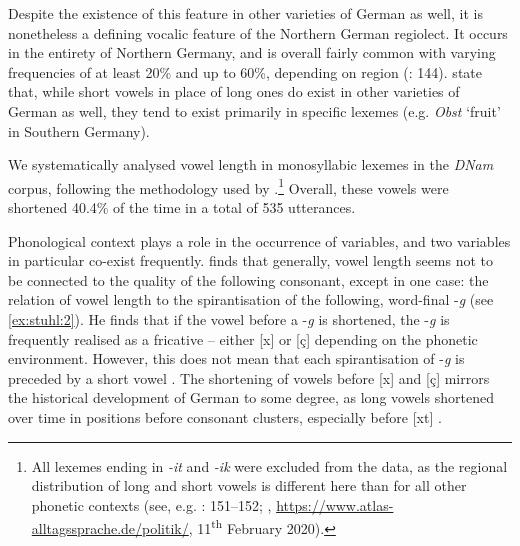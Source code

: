 \documentclass[output=paper]{langsci/langscibook}
\begin{document}
Despite the existence of this feature in other varieties of German as well, it is nonetheless a defining vocalic feature of the Northern German regiolect. It occurs in the entirety of Northern Germany, and is overall fairly common with varying frequencies of at least 20\% and up to 60\%, depending on region (\citealt{elmentaler_norddeutscher_2015}: 144).  \citet[142]{elmentaler_norddeutscher_2015} state that, while short vowels in place of long ones do exist in other varieties of German as well, they tend to exist primarily in specific lexemes (e.g. \textit{Obst} ‘fruit’ in Southern Germany). 

We systematically analysed vowel length in monosyllabic lexemes in the \textit{DNam} corpus, following the methodology used by  \citet[144]{elmentaler_norddeutscher_2015}.\footnote{All lexemes ending in \textit{-it} and \textit{-ik} were excluded from the data, as the regional distribution of long and short vowels is different here than for all other phonetic contexts (see, e.g. \citealt{elmentaler_norddeutscher_2015}: 151--152; \citealt{elspas_atlas_2003}, \url{https://www.atlas-alltagssprache.de/politik/}, 11\textsuperscript{th} February 2020).} Overall, these vowels were shortened 40.4\% of the time in a total of 535 utterances.

Phonological context plays a role in the occurrence of variables, and two variables in particular co-exist frequently. \citet[77]{elmentaler_varietatendynamik_2008} finds that generally, vowel length seems not to be connected to the quality of the following consonant, except in one case: the relation of vowel length to the spirantisation of the following, word-final -\textit{g} (see \ref{ex:stuhl:2}). He finds that if the vowel before a -\textit{g} is shortened, the -\textit{g} is frequently realised as a fricative – either [x] or [ç] depending on the phonetic environment. However, this does not mean that each spirantisation of -\textit{g} is preceded by a short vowel \citep[77]{elmentaler_varietatendynamik_2008}. The shortening of vowels before [x] and [ç] mirrors the historical development of German to some degree, as long vowels shortened over time in positions before consonant clusters, especially before [xt] \citep[152]{szulc_historische_1987}. 
\end{document}
